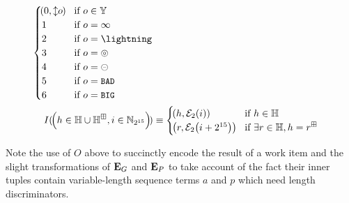 \begin{align}
\begin{cases}
    \tup{0, \var{o}} &\when o \in \blob \\
    1 &\when o = \infty \\
    2 &\when o = \panic \\
    3 &\when o = \badexports \\
    4 &\when o = \oversize \\
    5 &\when o = \token{BAD} \\
    6 &\when o = \token{BIG}
    \\
  \end{cases}
  \\
  \encodeimportref{\tup{
    h \in \hash \cup \hash^\boxplus,
    i \in \Nbits{15}
  }} &\equiv \begin{cases}
    \tup{h, \encode[2]{i}} &\when h \in \hash\\
    \tup{r, \encode[2]{i + 2^{15}}} &\when \exists r \in \hash, h = r^\boxplus\\
  \end{cases}
\end{align}

Note the use of $O$ above to succinctly encode the result of a work item and the slight transformations of $\mathbf{E}_G$ and $\mathbf{E}_P$ to take account of the fact their inner tuples contain variable-length sequence terms $a$ and $p$ which need length discriminators.
